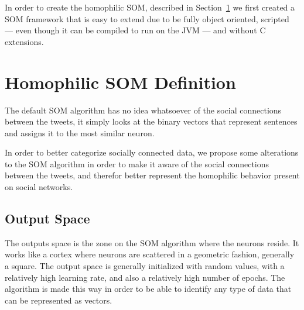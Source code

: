 In order to create the homophilic \ac{SOM}, described in Section~\ref{sec:algorithm_changes} we first created a \ac{SOM} framework that is easy to extend due to be fully object oriented, scripted --- even though it can be compiled to run on the JVM --- and without C extensions.



\section{Homophilic SOM Definition}
\label{sec:algorithm_changes}
The default \ac{SOM} algorithm has no idea whatsoever of the social connections between the tweets, it simply looks at the binary vectors that represent sentences and assigns it to the most similar neuron.

In order to better categorize socially connected data, we propose some alterations to the \ac{SOM} algorithm in order to make it aware of the social connections between the tweets, and therefor better represent the homophilic behavior present on social networks.

\subsection{Output Space}
\label{sub:output_space}
The outputs space is the zone on the \ac{SOM} algorithm where the neurons reside. It works like a cortex where neurons are scattered in a geometric fashion, generally a square. The output space is generally initialized with random values, with a relatively high learning rate, and also a relatively high number of epochs. The algorithm is made this way in order to be able to identify any type of data that can be represented as vectors.

